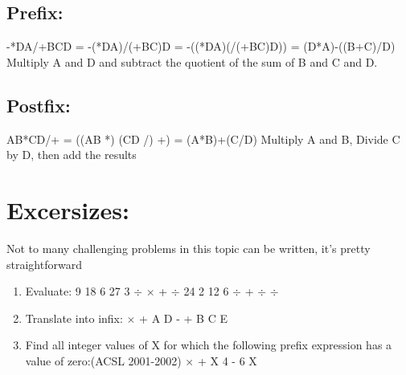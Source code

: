 \documentclass{article}
\begin{document}
\subsection{Prefix:}
-*DA/+BCD = -(*DA)/(+BC)D = -((*DA)(/(+BC)D)) = (D*A)-((B+C)/D) Multiply A and D and subtract the quotient of the sum of B and C and D.

\subsection{Postfix:}
AB*CD/+ = ((AB *) (CD /) +) = (A*B)+(C/D)
Multiply A and B, Divide C by D, then add the results

\section{Excersizes:}
Not to many challenging problems in this topic can be written, it's pretty straightforward

\begin{enumerate}

\item Evaluate: 9 18 6 27 3 $\div$ $\times$ + $\div$ 24 2 12 6 $\div$ + $\div$ $\div$

\item Translate into infix: $\times$ + A D - + B C E

\item Find all integer values of X for which the following prefix expression has
a value of zero:(ACSL 2001-2002) $\times$ + X 4 - 6 X 

\end{enumerate}



\enddocument
\end{document}
